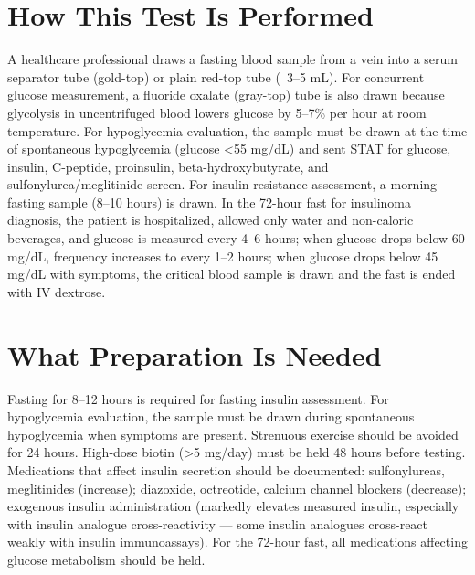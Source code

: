\section*{How This Test Is Performed}
A healthcare professional draws a fasting blood sample from a vein into a serum separator tube (gold-top) or plain red-top tube (~3--5 mL). For concurrent glucose measurement, a fluoride oxalate (gray-top) tube is also drawn because glycolysis in uncentrifuged blood lowers glucose by 5--7\% per hour at room temperature. For hypoglycemia evaluation, the sample must be drawn at the time of spontaneous hypoglycemia (glucose <55 mg/dL) and sent STAT for glucose, insulin, C-peptide, proinsulin, beta-hydroxybutyrate, and sulfonylurea/meglitinide screen. For insulin resistance assessment, a morning fasting sample (8--10 hours) is drawn. In the 72-hour fast for insulinoma diagnosis, the patient is hospitalized, allowed only water and non-caloric beverages, and glucose is measured every 4--6 hours; when glucose drops below 60 mg/dL, frequency increases to every 1--2 hours; when glucose drops below 45 mg/dL with symptoms, the critical blood sample is drawn and the fast is ended with IV dextrose.

\section*{What Preparation Is Needed}
Fasting for 8--12 hours is required for fasting insulin assessment. For hypoglycemia evaluation, the sample must be drawn during spontaneous hypoglycemia when symptoms are present. Strenuous exercise should be avoided for 24 hours. High-dose biotin (>5 mg/day) must be held 48 hours before testing. Medications that affect insulin secretion should be documented: sulfonylureas, meglitinides (increase); diazoxide, octreotide, calcium channel blockers (decrease); exogenous insulin administration (markedly elevates measured insulin, especially with insulin analogue cross-reactivity --- some insulin analogues cross-react weakly with insulin immunoassays). For the 72-hour fast, all medications affecting glucose metabolism should be held.

